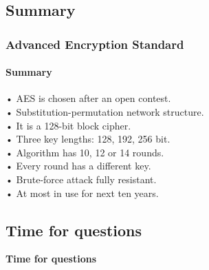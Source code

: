 \subsection{Summary}
\begin{frame}
	\frametitle{Advanced Encryption Standard}
		\framesubtitle{Summary}

	{\normalsize 	
	{• AES is chosen after an open contest.}\\
	\vspace{0,2cm}
{• Substitution-permutation network structure.}\\
\vspace{0,2cm}
{• It is a 128-bit block cipher.}\\
\vspace{0,2cm}
{• Three key lengths: 128, 192, 256 bit.}\\
\vspace{0,2cm}
{• Algorithm has 10, 12 or 14 rounds.}\\
\vspace{0,2cm}
{• Every round has a different key.}\\
\vspace{0,2cm}
{• Brute-force attack fully resistant.}\\
\vspace{0,2cm}
{• At most in use for next ten years.}\\
	}
	

\end{frame}
\subsection{Time for questions}
\begin{frame}
	
	\begin{center}
		\Huge \textbf{Time for questions}
	\end{center}

\end{frame}
